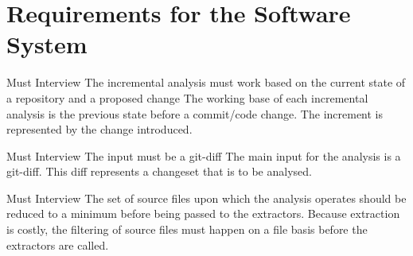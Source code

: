 \documentclass[a4paper]{article}
\begin{document}
\newpage
\lhead{{}}
\rhead{\leftmark}
\pagestyle{fancy}

\listoftodos[Notes]
\clearpage

\tableofcontents
\newpage


\maketitle
\newpage

\setcounter{page}{1}
\lhead{{}}
\rhead{\leftmark}
\pagestyle{fancy}

\section{Requirements for the Software System}

\begin{req}
	\reqtable
	{Must}  {Interview}
	{The incremental analysis must work based on the current state of a repository and a proposed change}
	{The working base of each incremental analysis is the previous state before a commit/code change. The increment is represented by the change introduced.}
\end{req}

\begin{req} \label{req:git-diff}
\reqtable
	{Must}  {Interview}
	{The input must be a git-diff}
	{The main input for the analysis is a git-diff. This diff represents a changeset that is to be analysed.}
\end{req}



\begin{req} \label{req:early-filtering}
\reqtable
	{Must}  {Interview}
	{The set of source files upon which the analysis operates should be reduced to a minimum before being passed to the extractors.}
	{Because extraction is costly, the filtering of source files must happen on a file basis before the extractors are called.}
\end{req}
\end{document}
